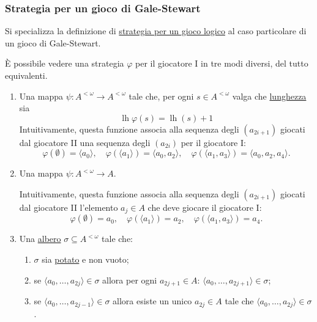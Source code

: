 \documentclass{article}
\newcommand{\1}{\mathds{1}}
\begin{document}
\subsubsection{Strategia per un gioco di Gale-Stewart}
\label{sec:org1db90c5}
Si specializza la definizione di \hyperref[sec:org7f68e17]{strategia per un gioco logico} al caso particolare di un gioco di Gale-Stewart.

È possibile vedere una strategia \(\varphi\) per il giocatore I in tre modi diversi, del tutto equivalenti.
\begin{enumerate}
\item Una mappa \(\psi: A^{<\omega}\to A^{<\omega}\) tale che, per ogni \(s \in A^{<\omega}\) valga che \href{../../../../../../../org/roam/20250206170922-sequenze_e_stringhe.org}{lunghezza} sia
\begin{equation*}
 \operatorname{lh}\varphi(s) = \operatorname{lh}(s) + 1
\end{equation*}
Intuitivamente, questa funzione associa alla sequenza degli \((a_{2i+1})\) giocati dal giocatore II una sequenza degli \((a_{2i})\) per il giocatore I:
\begin{equation*}
 \varphi(\emptyset) = \langle a_{0}\rangle,\quad \varphi(\langle a_{1}\rangle) = \langle a_{0},a_{2} \rangle,\quad \varphi(\langle a_{1},a_{3}\rangle) = \langle a_{0},a_{2},a_{4}\rangle.
\end{equation*}
\item Una mappa \(\psi: A^{<\omega}\to A\).

Intuitivamente, questa funzione associa alla sequenza degli \((a_{2i+1})\) giocati dal giocatore II l'elemento \(a_{j} \in A\) che deve giocare il giocatore I:
\begin{equation*}
 \varphi(\emptyset) = a_{0},\quad \varphi(\langle a_{1}\rangle) = a_{2},\quad \varphi(\langle a_{1},a_{3}\rangle) = a_{4}.
\end{equation*}
\item Una \href{../../../../../../../org/roam/20250514142154-albero_teoria_descrittiva_degli_insiemi.org}{albero} \(\sigma \subseteq A^{<\omega}\) tale che:
\begin{enumerate}
\item \(\sigma\) sia \href{../../../../../../../org/roam/20250514142208-albero_potato.org}{potato} e non vuoto;

\item se \(\langle a_{0},\dots,a_{2j}\rangle \in \sigma\) allora per ogni \(a_{2j+1} \in A\): \(\langle a_{0},\dots,a_{2j+1}\rangle \in \sigma\);

\item se \(\langle a_{0},\dots,a_{2j-1}\rangle \in \sigma\) allora esiste un unico \(a_{2j} \in A\) tale che \(\langle a_{0},\dots,a_{2j}\rangle \in \sigma\).
\end{enumerate}
\end{enumerate}
\end{document}
